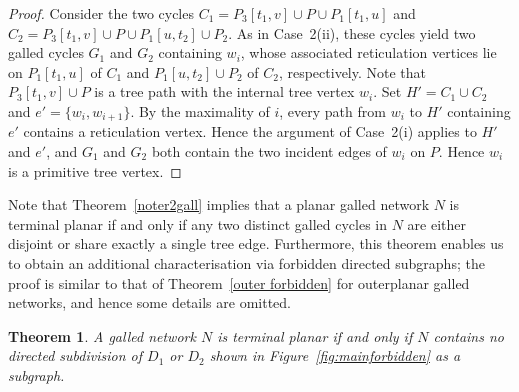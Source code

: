 \documentclass[pdflatex,sn-mathphys-num]{sn-jnl}
\theoremstyle{thmstyleone}%
\newtheorem{theorem}{Theorem}%
\theoremstyle{thmstyletwo}%
\theoremstyle{thmstylethree}%
\begin{document}
\begin{proof}
Consider the two cycles
$C_1=P_3[t_1,v]\cup P\cup P_1[t_1,u]$
and
$C_2=P_3[t_1,v]\cup P\cup P_1[u,t_2]\cup P_2$.
As in Case~2(ii), these cycles yield two galled cycles $G_1$ and $G_2$ containing $w_i$, whose associated reticulation vertices lie on $P_1[t_1,u]$ of $C_1$ and $P_1[u,t_2]\cup P_2$ of $C_2$, respectively. Note that $P_3[t_1,v]\cup P$ is a tree path with the internal tree vertex $w_i$. Set $H'=C_1\cup C_2$ and $e'=\{w_i,w_{i+1}\}$. By the maximality of $i$, every path from $w_i$ to $H'$ containing $e'$ contains a reticulation vertex. Hence the argument of Case~2(i) applies to $H'$ and $e'$, and $G_1$ and $G_2$ both contain the two incident edges of $w_i$ on $P$. Hence $w_i$ is a primitive tree vertex.
\end{proof}











Note that Theorem~\ref{noter2gall} implies that a planar galled network $N$ is terminal planar if and only if any two distinct galled cycles in $N$ are either disjoint or share exactly a single tree edge. Furthermore, this theorem enables us to obtain an additional characterisation  via forbidden directed subgraphs; the proof is similar to that of Theorem~\ref{outer forbidden} for outerplanar galled networks, and hence some details are omitted. 





\begin{theorem}\label{terminal forbidden}
A galled network $N$ is terminal planar if and only if $N$ contains no directed subdivision of $D_1$ or $D_2$ shown in Figure~\ref{fig:mainforbidden} as a subgraph.
\end{theorem}
\end{document}
